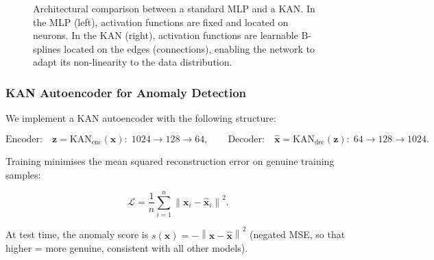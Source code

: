 \documentclass[12pt, a4paper]{article}
\newcommand{\norm}[1]{\left\lVert#1\right\rVert}
\begin{document}
\begin{figure}[H]
  \centering
  \caption{Architectural comparison between a standard MLP and a KAN.
    In the MLP (left), activation functions are fixed and located on
    neurons. In the KAN (right), activation functions are learnable
    B-splines located on the edges (connections), enabling the network
    to adapt its non-linearity to the data distribution.}
  \label{fig:kan_diagram}
\end{figure}

\subsubsection{KAN Autoencoder for Anomaly Detection}

We implement a KAN autoencoder with the following structure:

\begin{mathbox}
\begin{equation}
  \text{Encoder:}\quad
  \mathbf{z} = \text{KAN}_{\text{enc}}(\mathbf{x}):\;
  1024 \to 128 \to 64,
  \qquad
  \text{Decoder:}\quad
  \hat{\mathbf{x}} = \text{KAN}_{\text{dec}}(\mathbf{z}):\;
  64 \to 128 \to 1024.
  \label{eq:kan_ae}
\end{equation}
\end{mathbox}

\noindent Training minimises the mean squared reconstruction error on
genuine training samples:

\begin{mathbox}
\begin{equation}
  \mathcal{L} = \frac{1}{n} \sum_{i=1}^{n}
    \norm{\mathbf{x}_i - \hat{\mathbf{x}}_i}^2.
  \label{eq:ae_loss}
\end{equation}
\end{mathbox}

\noindent At test time, the anomaly score is
$s(\mathbf{x}) = -\norm{\mathbf{x} - \hat{\mathbf{x}}}^2$ (negated MSE,
so that higher = more genuine, consistent with all other models).
\end{document}
